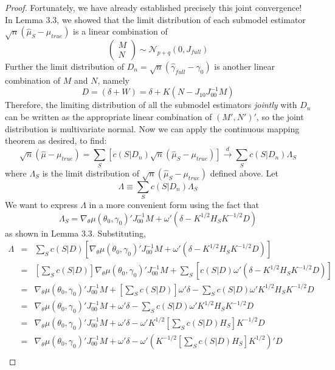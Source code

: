\documentclass[12pt]{article}
\theoremstyle{definition}
\begin{document}
\begin{proof}
Fortunately, we have already established precisely this joint convergence! In Lemma 3.3, we showed that the limit distribution of each submodel estimator $\sqrt{n}\left( \hat{\mu}_S -\mu_{true} \right)$ is a linear combination of
	$$
	\left(\begin{array}{c}M \\ N \end{array}\right) \sim \mathcal{N}_{p+q}(0, J_{full})
$$
Further the limit distribution of $D_n = \sqrt{n}\left( \hat{\gamma}_{full} - \gamma_0 \right)$ is another linear combination of $M$ and $N$, namely 
	$$D = (\delta + W) = \delta + K\left(N - J_{10}J_{00}^{-1}M\right)$$
Therefore, the limiting distribution of all the submodel estimators \emph{jointly} with $D_n$ can be written as the appropriate linear combination of $(M',N')'$, so the joint distribution is multivariate normal. Now we can apply the continuous mapping theorem as desired, to find:
	$$
\sqrt{n}\left( \hat{\mu} -\mu_{true} \right) = \sum_S \left[ c(S|D_n) \sqrt{n}\left( \hat{\mu}_S -\mu_{true} \right)  \right] \overset{d}{\rightarrow} \sum_S c(S|D_n) \Lambda_S
$$
where $\Lambda_S$ is the limit distribution of $\sqrt{n}\left( \hat{\mu}_S -\mu_{true} \right)$ defined above. Let
	$$\Lambda \equiv \sum_S c(S|D_n) \Lambda_S$$
We want to express $\Lambda$ in a more convenient form using the fact that
	$$\Lambda_S = \nabla_{\theta}\mu(\theta_0, \gamma_0)'J_{00}^{-1}M + \omega'\left(\delta -K^{1/2}H_S K^{-1/2}D\right)$$
as shown in Lemma 3.3. Substituting,
	\begin{eqnarray*}
	\Lambda &=& \sum_S c(S|D) \left[\nabla_{\theta}\mu(\theta_0, \gamma_0)'J_{00}^{-1}M + \omega'\left(\delta -K^{1/2}H_S K^{-1/2}D\right)  \right] \\
			&=&\left[ \sum_S c(S|D)\right]\nabla_{\theta}\mu(\theta_0, \gamma_0)'J_{00}^{-1}M+  \sum_S \left[c(S|D)\omega'\left(\delta -K^{1/2}H_S K^{-1/2}D\right) \right] \\
			&=&\nabla_{\theta}\mu(\theta_0, \gamma_0)'J_{00}^{-1}M+  \left[\sum_S c(S|D)\right]\omega'\delta - \sum_S c(S|D)\omega 'K^{1/2}H_S K^{-1/2}D \\
			&=&\nabla_{\theta}\mu(\theta_0, \gamma_0)'J_{00}^{-1}M+  \omega'\delta - \sum_S c(S|D)\omega 'K^{1/2}H_S K^{-1/2}D \\
			&=&\nabla_{\theta}\mu(\theta_0, \gamma_0)'J_{00}^{-1}M+  \omega'\delta - \omega 'K^{1/2}\left[ \sum_S c(S|D)H_S\right] K^{-1/2}D \\
			&=&\nabla_{\theta}\mu(\theta_0, \gamma_0)'J_{00}^{-1}M+  \omega'\delta - \omega '\left(K^{-1/2}\left[ \sum_S c(S|D)H_S\right] K^{1/2}\right)'D \\

\end{eqnarray*}
\end{proof}
\end{document}
